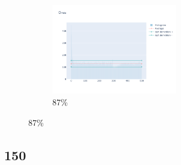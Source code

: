 \documentclass[12pt, fleqn]{report}                             %
\theoremstyle{break}                                            %
\begin{document}
\begin{figure}[ht!]
\begin{subfigure}[b]{0.4\linewidth}
          \includegraphics[width=0.6\textwidth]{Images/146/dia-d.png}
          \caption{87\%}
        \end{subfigure}
      \end{figure}


      \clearpage
      \subsection{150}
\end{document}

